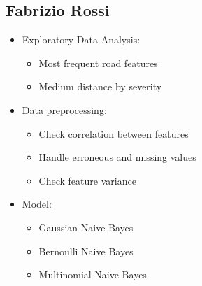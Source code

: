 \documentclass{article}
\begin{document}
\subsection*{Fabrizio Rossi}
\begin{itemize}
\item Exploratory Data Analysis:
	\begin{itemize}
	\item Most frequent road features
	\item Medium distance by severity
	\end{itemize}
\item Data preprocessing:
	\begin{itemize}
	\item Check correlation between features
	\item Handle erroneous and missing values
	\item Check feature variance
	\end{itemize}
\item Model:
	\begin{itemize}
	\item Gaussian Naive Bayes
	\item Bernoulli Naive Bayes
	\item Multinomial Naive Bayes
	\end{itemize}
\end{itemize}
\end{document}
